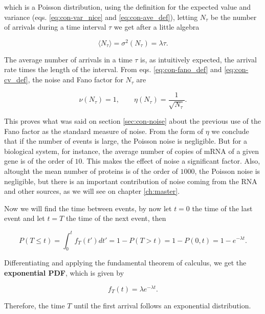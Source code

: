 which is a Poisson distribution, using the definition for the expected value and variance (eqs. \eqref{eq:con-var_nice} and \eqref{eq:con-ave_def}), letting $N_\tau$ be the number of arrivals during a time interval $\tau$  we get after a little algebra

\begin{equation*}
  \langle N_\tau\rangle = \sigma^2(N_\tau) = \lambda \tau.
\end{equation*}

The average number of arrivals in a time $\tau$ is, as intuitively expected, the arrival rate times the length of the interval. From eqs. \eqref{eq:con-fano_def} and \eqref{eq:con-cv_def}, the noise and Fano factor for $N_\tau$ are

\begin{equation*}
  \nu(N_\tau) = 1,\quad\quad \eta(N_\tau) = \frac{1}{\sqrt{N_\tau}}.
\end{equation*}

This proves what was said on section \ref{sec:con-noise} about the previous use of the Fano factor as the standard measure of noise. From the form of $\eta$ we conclude that if the number of events is large, the Poisson noise is negligible. But for a biological system, for instance, the average number of copies of mRNA of a given gene is of the order of $10$. This makes the effect of noise a significant factor. Also, altought the mean number of proteins is of the order of $1000$, the Poisson noise is negligible, but there is an important contribution of noise coming from the RNA and other sources, as we will see on chapter \ref{ch:master}.

Now we will find the time between events, by now let $t=0$ the time of the last event and let $t=T$ the time of the next event, then

\begin{equation*}
  P(T\leq t) =\int_0^tf_T(t')dt'=1-P(T>t) = 1 - P(0,t) = 1 - e^{-\lambda t}.
\end{equation*}

Differentiating and applying the fundamental theorem of calculus, we get the \textbf{exponential PDF}, which is given by

\begin{equation*}
  \label{eq:con-exp_pdf}
  f_T(t) = \lambda e^{-\lambda t}.
\end{equation*}

Therefore, the time $T$ until the first arrival follows an exponential distribution. 

